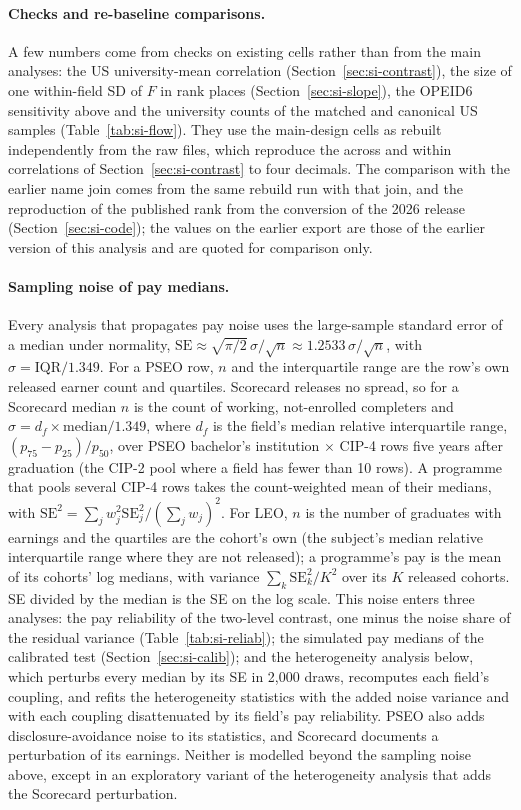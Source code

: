 \documentclass[11pt]{article}
\begin{document}
\paragraph{Checks and re-baseline comparisons.} A few numbers come from checks on existing cells rather than from
the main analyses: the US university-mean correlation (Section~\ref{sec:si-contrast}), the size of one within-field
SD of $F$ in rank places (Section~\ref{sec:si-slope}), the OPEID6 sensitivity above and the university counts of the
matched and canonical US samples (Table~\ref{tab:si-flow}). They use the main-design cells as rebuilt independently
from the raw files, which reproduce the across and within correlations of Section~\ref{sec:si-contrast} to four
decimals. The comparison with the earlier name join comes from the same rebuild run with that join, and the
reproduction of the published rank from the conversion of the 2026 release (Section~\ref{sec:si-code}); the values on
the earlier export are those of the earlier version of this analysis and are quoted for comparison only.

\paragraph{Sampling noise of pay medians.} Every analysis that propagates pay noise uses the large-sample standard
error of a median under normality, $\mathrm{SE}\approx\sqrt{\pi/2}\,\sigma/\sqrt n\approx1.2533\,\sigma/\sqrt n$,
with $\sigma=\mathrm{IQR}/1.349$. For a PSEO row, $n$ and the interquartile range are the row's own released
earner count and quartiles. Scorecard releases no spread, so for a Scorecard median $n$ is the count of working,
not-enrolled completers and $\sigma=d_f\times\text{median}/1.349$, where $d_f$ is the field's median relative
interquartile range, $(p_{75}-p_{25})/p_{50}$, over PSEO bachelor's institution $\times$ CIP-4 rows five years after
graduation (the CIP-2 pool where a field has fewer than 10 rows). A programme that pools several CIP-4 rows takes the
count-weighted mean of their medians, with $\mathrm{SE}^2=\sum_jw_j^2\mathrm{SE}_j^2/(\sum_jw_j)^2$. For LEO, $n$ is
the number of graduates with earnings and the quartiles are the cohort's own (the subject's median relative
interquartile range where they are not released); a programme's pay is the mean of its cohorts' log medians, with
variance $\sum_k\mathrm{SE}_k^2/K^2$ over its $K$ released cohorts. SE divided by the median is the SE on the log
scale. This noise enters three analyses: the pay reliability of the two-level contrast, one minus the noise share of
the residual variance (Table~\ref{tab:si-reliab}); the simulated pay medians of the calibrated test
(Section~\ref{sec:si-calib}); and the heterogeneity analysis below, which perturbs every median by its SE in 2,000
draws, recomputes each field's coupling, and refits the heterogeneity statistics with the added noise variance and
with each coupling disattenuated by its field's pay reliability. PSEO also adds disclosure-avoidance noise to its
statistics, and Scorecard documents a perturbation of its earnings. Neither is modelled beyond the sampling noise
above, except in an exploratory variant of the heterogeneity analysis that adds the Scorecard perturbation.
\end{document}
